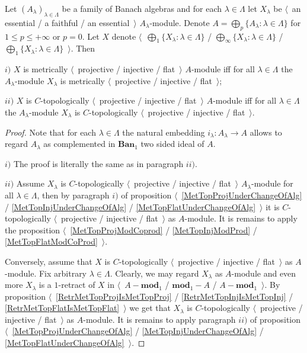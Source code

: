 \begin{proposition}\label{MetTopProjInjFlatUnderSumOfAlg} Let $(A_\lambda)_{\lambda\in\Lambda}$ be a family of Banach algebras and for each $\lambda\in\Lambda$ let $X_\lambda$ be $\langle$~an essential / a faithful / an essential~$\rangle$ $A_\lambda$-module. Denote $A=\bigoplus_p\{A_\lambda:\lambda\in\Lambda\}$ for $1\leq p\leq +\infty$ or $p=0$. Let $X$ denote $\langle$~$\bigoplus_1\{X_\lambda:\lambda\in\Lambda\}$ / $\bigoplus_\infty\{X_\lambda:\lambda\in\Lambda\}$ / $\bigoplus_1\{X_\lambda:\lambda\in\Lambda\}$~$\rangle$. Then

$i)$ $X$ is metrically $\langle$~projective / injective / flat~$\rangle$ $A$-module iff for all $\lambda\in\Lambda$ the $A_\lambda$-module $X_\lambda$ is metrically $\langle$~projective / injective / flat~$\rangle$;

$ii)$ $X$ is $C$-topologically $\langle$~projective / injective / flat~$\rangle$ $A$-module iff for all $\lambda\in\Lambda$ the $A_\lambda$-module $X_\lambda$ is $C$-topologically $\langle$~projective / injective / flat~$\rangle$.
\end{proposition}
\begin{proof} Note that for each $\lambda\in\Lambda$ the natural embedding $i_\lambda:A_\lambda\to A$ allows to regard $A_\lambda$ as complemented in $\mathbf{Ban}_1$ two sided ideal of $A$.

$i)$ The proof is literally the same as in paragraph $ii)$.

$ii)$ Assume $X_\lambda$ is $C$-topologically $\langle$~projective / injective / flat~$\rangle$ $A_\lambda$-module for all $\lambda\in\Lambda$, then by paragraph $i)$ of proposition $\langle$~\ref{MetTopProjUnderChangeOfAlg} / \ref{MetTopInjUnderChangeOfAlg} / \ref{MetTopFlatUnderChangeOfAlg}~$\rangle$ it is $C$-topologically $\langle$~projective / injective / flat~$\rangle$ as $A$-module. It is remains to apply the proposition $\langle$~\ref{MetTopProjModCoprod} / \ref{MetTopInjModProd} / \ref{MetTopFlatModCoProd}~$\rangle$. 

Conversely, assume that $X$ is $C$-topologically $\langle$~projective / injective / flat~$\rangle$ as $A$-module. Fix arbitrary $\lambda\in\Lambda$. Clearly, we may regard $X_\lambda$ as $A$-module and even more $X_\lambda$ is a $1$-retract of $X$ in $\langle$~$A-\mathbf{mod}_1$ / $\mathbf{mod}_1-A$ / $A-\mathbf{mod}_1$~$\rangle$. By proposition $\langle$~\ref{RetrMetTopProjIsMetTopProj} / \ref{RetrMetTopInjIsMetTopInj} / \ref{RetrMetTopFlatIsMetTopFlat}~$\rangle$ we get that $X_\lambda$ is $C$-topologically $\langle$~projective / injective / flat~$\rangle$ as $A$-module. It is remains to apply paragraph $ii)$ of proposition $\langle$~\ref{MetTopProjUnderChangeOfAlg} / \ref{MetTopInjUnderChangeOfAlg} / \ref{MetTopFlatUnderChangeOfAlg}~$\rangle$.
\end{proof} 

